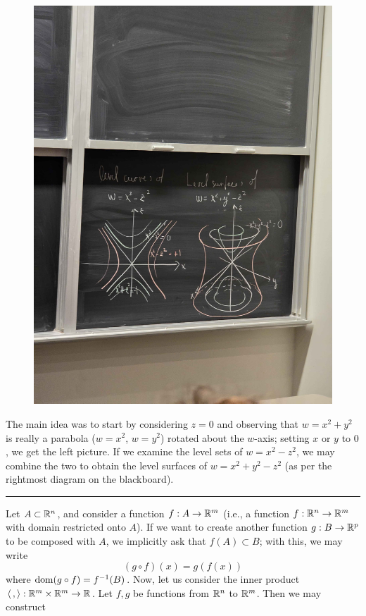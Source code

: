 \begin{figure}[h]
    \includegraphics[scale=0.06]{MAT257 Notes/Diagrams/Day 4 Graph 2.jpg}
\end{figure}
\medskip\newline
\noindent The main idea was to start by considering $z = 0$ and observing that $w = x^2 + y^2$ is really a parabola ($w = x^2$, $w = y^2$) rotated about the $w$-axis; setting $x$ or $y$ to $0$, we get the left picture. If we examine the level sets of $w = x^2 - z^2$, we may combine the two to obtain the level surfaces of $w = x^2 + y^2 - z^2$ (as per the rightmost diagram on the blackboard).
\bigskip\hrule\bigskip
\noindent Let $A \subset \mathbb R^n$, and consider a function $f : A \to \mathbb R^m$ (i.e., a function $f : \mathbb R^n \to \mathbb R^m$ with domain restricted onto $A$). If we want to create another function $g : B \to \mathbb R^p$ to be composed with $A$, we implicitly ask that $f(A) \subset B$; with this, we may write
\[ (g \circ f)(x) = g(f(x)) \]
where $\operatorname{dom} (g \circ f) = f^{-1}(B)$. Now, let us consider the inner product $\left< \, , \right> : \mathbb R^m \times \mathbb R^m \to \mathbb R$. Let $f, g$ be functions from $\mathbb R^n$ to $\mathbb R^m$. Then we may construct
